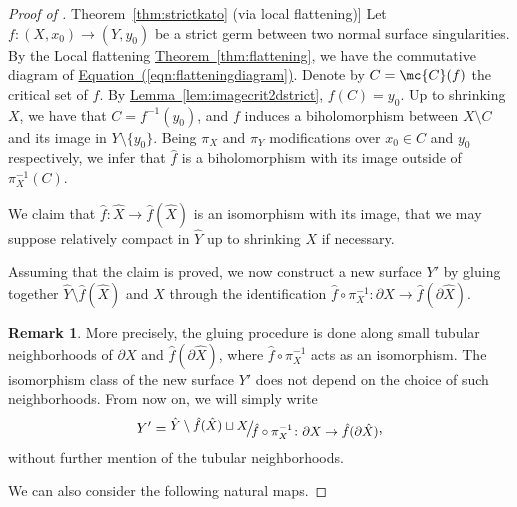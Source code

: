 \documentclass[11 pt, twoside, a4paper]{amsart}
\def\nfrac#1#2{%
    \raise.5ex\hbox{\small{$#1$}}%
    \kern-.18em\big/\kern-.2em%
    \lower.5ex\hbox{\small{$#2$}}}
\newtheorem{prop}[thm]{Proposition}
\theoremstyle{definition}
\newtheorem{rem}[thm]{Remark}
\theoremstyle{definition}
\newcommand{\refthm}[1]{\hyperref[thm:#1]{Theorem~\ref*{thm:#1}}}
\newcommand{\reflem}[1]{\hyperref[lem:#1]{Lemma~\ref*{lem:#1}}}
\newcommand{\refeqn}[1]{\hyperref[eqn:#1]{Equation~(\ref*{eqn:#1})}}
\begin{document}
\begin{proof}[Proof of \refthm{strictkato} (via local flattening)]
Let $f\colon (X,x_0) \to (Y,y_0)$ be a strict germ between two normal surface singularities.
By the Local flattening \refthm{flattening}, we have the commutative diagram of \refeqn{flatteningdiagram}. 
Denote by $C=\mc{C}(f)$ the critical set of $f$. By \reflem{imagecrit2dstrict}, $f(C)=y_0$.
Up to shrinking $X$, we have that $C=f^{-1}(y_0)$, and $f$ induces a biholomorphism between $X \setminus C$ and its image in $Y\setminus \{y_0\}$.
Being $\pi_X$ and $\pi_Y$ modifications over $x_0 \in C$ and $y_0$ respectively, we infer that $\hat{f}$ is a biholomorphism with its image outside of $\pi_X^{-1} (C)$.

We claim that $\hat{f} \colon \hat{X} \to \hat{f}(\hat{X})$ is an isomorphism with its image, that we may suppose relatively compact in $\hat{Y}$ up to shrinking $X$ if necessary. 

Assuming that the claim is proved, we now construct a new surface $Y'$ by gluing together $\hat{Y} \setminus \hat{f}(\hat{X})$ and $X$ through the identification $\hat{f} \circ \pi_X^{-1} \colon \partial X \to \hat{f}(\partial \hat{X})$.

\begin{rem}
More precisely, the gluing procedure is done along small tubular neighborhoods of $\partial X$ and $\hat{f}(\partial \hat{X})$, where $\hat{f} \circ \pi_X^{-1}$ acts as an isomorphism. The isomorphism class of the new surface $Y'$ does not depend on the choice of such neighborhoods.
From now on, we will simply write
\[
Y'= \nfrac{\hat{Y} \setminus \hat{f}(\hat{X}) \sqcup X}{\hat{f} \circ \pi_X^{-1} \colon \partial X \to \hat{f}(\partial\hat{X})}\text{,}
\]
without further mention of the tubular neighborhoods.
\end{rem}


We can also consider the following natural maps.


\end{proof}
\end{document}
